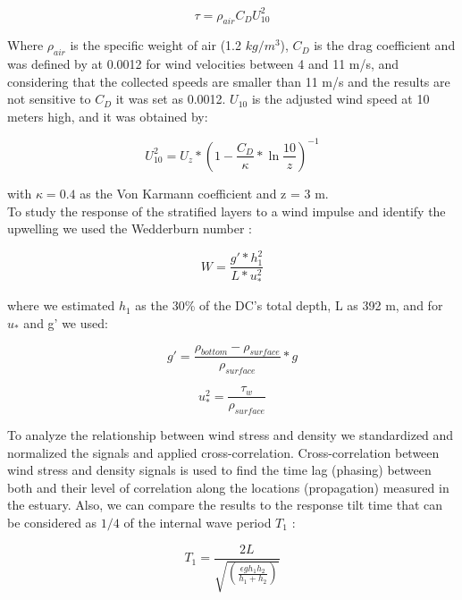 \documentclass[tesis.tex]{subfiles}
\begin{document}
\begin{equation}
    \tau=\rho_{air} C_D U_{10}^2
    \label{eq: tau}
\end{equation}

Where $\rho_{air}$ is the specific weight of air (1.2 $kg/m^3$), $C_D$ is the drag coefficient and was defined by \cite{large1981open} at 0.0012 for wind velocities between 4 and 11 m/s, and considering that the collected speeds are smaller than 11 m/s and the results are not sensitive to $C_D$ it was set as 0.0012. $U_{10}$ is the adjusted wind speed at 10 meters high, and it was obtained by: 

\begin{equation}
    U_{10}^2=U_z*(1-\frac{C_D}{\kappa}*\ln{\frac{10}{z}})^{-1}
    \label{eq: adjvel}
\end{equation}

with $\kappa=0.4$ as the Von Karmann coefficient and z = 3 m.\\

To study the response of the stratified layers to a wind impulse and identify the upwelling we used the Wedderburn number \citep{Shintani2010}:

\begin{equation}
    W=\frac{g'*h_1^2}{L*u_*^2}
    \label{eq: wed}
\end{equation}

where we estimated $h_1$ as the 30\% of the DC's total depth, L as 392 m, and for $u_*$ and g' we used:

\begin{equation}
    g'=\frac{\rho_{bottom}-\rho_{surface}}{\rho_{surface}}*g
    \label{eq: redg}
\end{equation}

\begin{equation}
    u_*^2=\frac{\tau_w}{\rho_{surface}}
    \label{eq: ustar}
\end{equation}


To analyze the relationship between wind stress and density we standardized and normalized the signals and applied cross-correlation. Cross-correlation between wind stress and density signals is used to find the time lag (phasing) between both and their level of correlation along the locations (propagation) measured in the estuary. Also, we can compare the results to the response tilt time that can be considered as $1/4$ of the internal wave period $T_1$ \citep{stevens1996initial}: 

\begin{equation}
    T_1=\frac{2L}{\sqrt{(\frac{\epsilon g h_1 h_2}{h_1 + h_2})}}
    \label{eq: period}
\end{equation}
\end{document}
